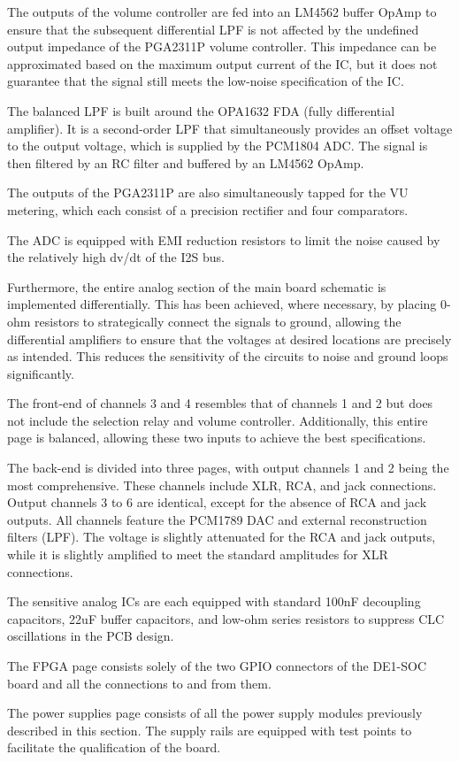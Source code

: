 The outputs of the volume controller are fed into an LM4562 buffer OpAmp to ensure that the subsequent differential LPF is not affected by the undefined output impedance of the PGA2311P volume controller. This impedance can be approximated based on the maximum output current of the IC, but it does not guarantee that the signal still meets the low-noise specification of the IC.

The balanced LPF is built around the OPA1632 FDA (fully differential amplifier). It is a second-order LPF that simultaneously provides an offset voltage to the output voltage, which is supplied by the PCM1804 ADC. The signal is then filtered by an RC filter and buffered by an LM4562 OpAmp.

The outputs of the PGA2311P are also simultaneously tapped for the VU metering, which each consist of a precision rectifier and four comparators.

The ADC is equipped with EMI reduction resistors to limit the noise caused by the relatively high dv/dt of the I2S bus.

Furthermore, the entire analog section of the main board schematic is implemented differentially. This has been achieved, where necessary, by placing 0-ohm resistors to strategically connect the signals to ground, allowing the differential amplifiers to ensure that the voltages at desired locations are precisely as intended. 
This reduces the sensitivity of the circuits to noise and ground loops significantly.

The front-end of channels 3 and 4 resembles that of channels 1 and 2 but does not include the selection relay and volume controller. Additionally, this entire page is balanced, allowing these two inputs to achieve the best specifications.

The back-end is divided into three pages, with output channels 1 and 2 being the most comprehensive. These channels include XLR, RCA, and jack connections. Output channels 3 to 6 are identical, except for the absence of RCA and jack outputs. All channels feature the PCM1789 DAC and external reconstruction filters (LPF). The voltage is slightly attenuated for the RCA and jack outputs, while it is slightly amplified to meet the standard amplitudes for XLR connections.

The sensitive analog ICs are each equipped with standard 100nF decoupling capacitors, 22uF buffer capacitors, and low-ohm series resistors to suppress CLC oscillations in the PCB design.

The FPGA page consists solely of the two GPIO connectors of the DE1-SOC board and all the connections to and from them.

The power supplies page consists of all the power supply modules previously described in this section. The supply rails are equipped with test points to facilitate the qualification of the board.